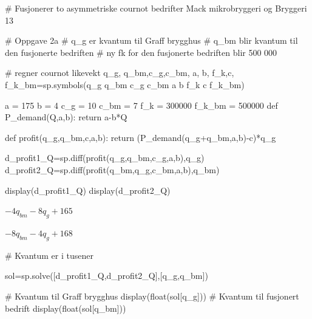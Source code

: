 \documentclass[
  12pt,
  a4paper,
  DIV=11,
  numbers=noendperiod]{scrartcl}
\newenvironment{Shaded}{\begin{snugshade}}{\end{snugshade}}
\newcommand{\BuiltInTok}[1]{\textcolor[rgb]{0.00,0.23,0.31}{#1}}
\newcommand{\CommentTok}[1]{\textcolor[rgb]{0.37,0.37,0.37}{#1}}
\newcommand{\ControlFlowTok}[1]{\textcolor[rgb]{0.00,0.23,0.31}{#1}}
\newcommand{\DecValTok}[1]{\textcolor[rgb]{0.68,0.00,0.00}{#1}}
\newcommand{\KeywordTok}[1]{\textcolor[rgb]{0.00,0.23,0.31}{#1}}
\newcommand{\NormalTok}[1]{\textcolor[rgb]{0.00,0.23,0.31}{#1}}
\newcommand{\OperatorTok}[1]{\textcolor[rgb]{0.37,0.37,0.37}{#1}}
\newcommand{\StringTok}[1]{\textcolor[rgb]{0.13,0.47,0.30}{#1}}
\begin{document}
\begin{Shaded}
\begin{Highlighting}[]
\CommentTok{\# Fusjonerer to asymmetriske cournot bedrifter Mack mikrobryggeri og Bryggeri 13}

\CommentTok{\# Oppgave 2a}
\CommentTok{\# q\_g er kvantum til Graff brygghus}
\CommentTok{\# q\_bm blir kvantum til den fusjonerte bedriften}
\CommentTok{\# ny fk for den fusjonerte bedriften blir 500 000}

\CommentTok{\# regner cournot likevekt}
\NormalTok{q\_g, q\_bm,c\_g,c\_bm, a, b, f\_k,c, f\_k\_bm}\OperatorTok{=}\NormalTok{sp.symbols(}\StringTok{\textquotesingle{}q\_g q\_bm c\_g c\_bm a b f\_k c f\_k\_bm\textquotesingle{}}\NormalTok{)}

\NormalTok{a }\OperatorTok{=} \DecValTok{175}
\NormalTok{b }\OperatorTok{=} \DecValTok{4}
\NormalTok{c\_g }\OperatorTok{=} \DecValTok{10}
\NormalTok{c\_bm }\OperatorTok{=} \DecValTok{7}
\NormalTok{f\_k }\OperatorTok{=} \DecValTok{300000}
\NormalTok{f\_k\_bm }\OperatorTok{=} \DecValTok{500000}
\KeywordTok{def}\NormalTok{ P\_demand(Q,a,b):}
    \ControlFlowTok{return}\NormalTok{ a}\OperatorTok{{-}}\NormalTok{b}\OperatorTok{*}\NormalTok{Q}

\KeywordTok{def}\NormalTok{ profit(q\_g,q\_bm,c,a,b):}
    \ControlFlowTok{return}\NormalTok{ (P\_demand(q\_g}\OperatorTok{+}\NormalTok{q\_bm,a,b)}\OperatorTok{{-}}\NormalTok{c)}\OperatorTok{*}\NormalTok{q\_g}
\end{Highlighting}
\end{Shaded}

\begin{Shaded}
\begin{Highlighting}[]
\NormalTok{d\_profit1\_Q}\OperatorTok{=}\NormalTok{sp.diff(profit(q\_g,q\_bm,c\_g,a,b),q\_g)}
\NormalTok{d\_profit2\_Q}\OperatorTok{=}\NormalTok{sp.diff(profit(q\_bm,q\_g,c\_bm,a,b),q\_bm)}


\NormalTok{display(d\_profit1\_Q)}
\NormalTok{display(d\_profit2\_Q)}
\end{Highlighting}
\end{Shaded}

$\displaystyle - 4 q_{bm} - 8 q_{g} + 165$

$\displaystyle - 8 q_{bm} - 4 q_{g} + 168$

\begin{Shaded}
\begin{Highlighting}[]
\CommentTok{\# Kvantum er i tusener}

\NormalTok{sol}\OperatorTok{=}\NormalTok{sp.solve([d\_profit1\_Q,d\_profit2\_Q],[q\_g,q\_bm])}

\CommentTok{\# Kvantum til Graff brygghus}
\NormalTok{display(}\BuiltInTok{float}\NormalTok{(sol[q\_g]))}
\CommentTok{\# Kvantum til fusjonert bedrift}
\NormalTok{display(}\BuiltInTok{float}\NormalTok{(sol[q\_bm]))}
\end{Highlighting}
\end{Shaded}
\end{document}
